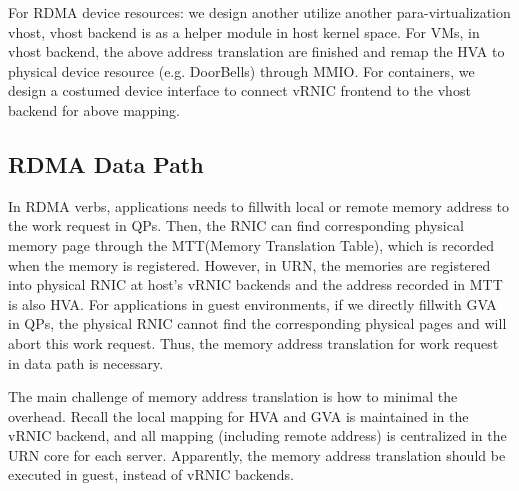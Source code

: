  For RDMA device resources: we design another utilize another para-virtualization vhost, vhost backend is as a helper module in host kernel space. For VMs, in vhost backend, the above address translation are finished  and remap the HVA to physical device resource (e.g. DoorBells) through MMIO. For containers, we design a costumed device interface to connect vRNIC frontend to the vhost backend for above mapping.
 
\subsection{RDMA Data Path}
In RDMA verbs, applications needs to fillwith local or remote memory address to the work request in QPs. Then, the RNIC can find corresponding physical memory page through the MTT(Memory Translation Table), which is recorded when the memory is registered. However, in URN, the memories are registered into physical RNIC at host's vRNIC backends and the address recorded in MTT is also HVA. For applications in guest environments, if we directly fillwith GVA in QPs, the physical RNIC cannot find the corresponding physical pages and will abort this work request. Thus, the memory address translation for work request in data path is necessary. 

 
The main challenge of memory address translation is how to minimal the overhead. Recall the local mapping for HVA and GVA is maintained in the vRNIC backend, and all mapping (including remote address) is centralized in the URN core for each server. Apparently, the memory address translation should be executed in guest, instead of vRNIC backends. 


